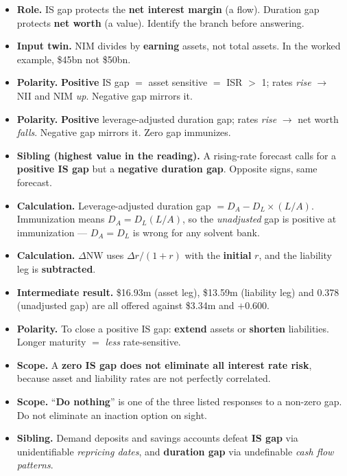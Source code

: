 \begin{lrtrapbox}
\begin{itemize}
\item \textbf{Role.} IS gap protects the \textbf{net interest margin} (a flow). Duration gap protects \textbf{net worth} (a value). Identify the branch before answering.
\item \textbf{Input twin.} NIM divides by \textbf{earning} assets, not total assets. In the worked example, \$45bn not \$50bn.
\item \textbf{Polarity.} \textbf{Positive} IS gap $=$ asset sensitive $=$ ISR $>$ 1; rates \emph{rise} $\rightarrow$ NII and NIM \emph{up}. Negative gap mirrors it.
\item \textbf{Polarity.} \textbf{Positive} leverage-adjusted duration gap; rates \emph{rise} $\rightarrow$ net worth \emph{falls}. Negative gap mirrors it. Zero gap immunizes.
\item \textbf{Sibling (highest value in the reading).} A rising-rate forecast calls for a \textbf{positive IS gap} but a \textbf{negative duration gap}. Opposite signs, same forecast.
\item \textbf{Calculation.} Leverage-adjusted duration gap $= D_A - D_L \times (L/A)$. Immunization means $D_A = D_L(L/A)$, so the \emph{unadjusted} gap is positive at immunization --- $D_A = D_L$ is wrong for any solvent bank.
\item \textbf{Calculation.} $\Delta \text{NW}$ uses $\Delta r / (1 + r)$ with the \textbf{initial} $r$, and the liability leg is \textbf{subtracted}.
\item \textbf{Intermediate result.} \$16.93m (asset leg), \$13.59m (liability leg) and 0.378 (unadjusted gap) are all offered against \$3.34m and $+0.600$.
\item \textbf{Polarity.} To close a positive IS gap: \textbf{extend} assets or \textbf{shorten} liabilities. Longer maturity $=$ \emph{less} rate-sensitive.
\item \textbf{Scope.} A \textbf{zero IS gap does not eliminate all interest rate risk}, because asset and liability rates are not perfectly correlated.
\item \textbf{Scope.} ``\textbf{Do nothing}'' is one of the three listed responses to a non-zero gap. Do not eliminate an inaction option on sight.
\item \textbf{Sibling.} Demand deposits and savings accounts defeat \textbf{IS gap} via unidentifiable \emph{repricing dates}, and \textbf{duration gap} via undefinable \emph{cash flow patterns}.
\end{itemize}
\end{lrtrapbox}
